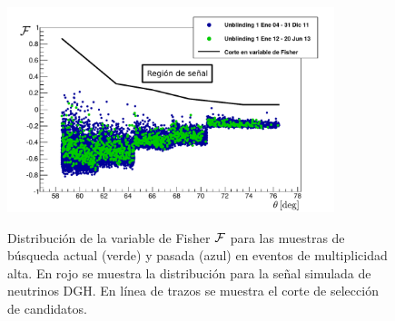 	\begin{figure}[ht!]
		\begin{center}
			\includegraphics[width=0.85\textwidth]{fig/resultadosAuger/DGL_Unblinding_Thesis}\\
			\caption{\label{fig:unblindingDGL}
			Distribuci\'on de la variable de Fisher $\cal F$ para las muestras de b\'usqueda actual (verde) y pasada (azul) en eventos de multiplicidad alta. En rojo se muestra la distribuci\'on para la se\~nal simulada de neutrinos DGH.
			En l\'inea de trazos se muestra el corte de selecci\'on de candidatos.
			}
		\end{center}
	\end{figure}
	
	
